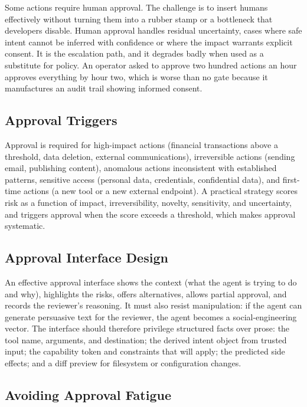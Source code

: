 \documentclass[11pt]{book}
\begin{document}
Some actions require human approval. The challenge is to insert humans effectively without turning them into a rubber stamp or a bottleneck that developers disable. Human approval handles residual uncertainty, cases where safe intent cannot be inferred with confidence or where the impact warrants explicit consent. It is the escalation path, and it degrades badly when used as a substitute for policy. An operator asked to approve two hundred actions an hour approves everything by hour two, which is worse than no gate because it manufactures an audit trail showing informed consent.

\subsection{Approval Triggers}

Approval is required for high-impact actions (financial transactions above a threshold, data deletion, external communications), irreversible actions (sending email, publishing content), anomalous actions inconsistent with established patterns, sensitive access (personal data, credentials, confidential data), and first-time actions (a new tool or a new external endpoint). A practical strategy scores risk as a function of impact, irreversibility, novelty, sensitivity, and uncertainty, and triggers approval when the score exceeds a threshold, which makes approval systematic.

\subsection{Approval Interface Design}

An effective approval interface shows the context (what the agent is trying to do and why), highlights the risks, offers alternatives, allows partial approval, and records the reviewer's reasoning. It must also resist manipulation: if the agent can generate persuasive text for the reviewer, the agent becomes a social-engineering vector. The interface should therefore privilege structured facts over prose: the tool name, arguments, and destination; the derived intent object from trusted input; the capability token and constraints that will apply; the predicted side effects; and a diff preview for filesystem or configuration changes.

\subsection{Avoiding Approval Fatigue}
\end{document}
